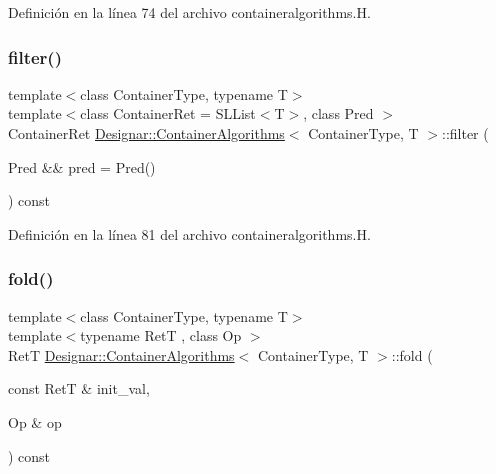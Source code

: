 Definición en la línea 74 del archivo containeralgorithms.\+H.

\mbox{\label{class_designar_1_1_container_algorithms_a9ee9df4da794711c3639a3c86d905443}} 
\subsubsection{\texorpdfstring{filter()}{filter()}\hspace{0.1cm}{\footnotesize\ttfamily [2/2]}}
{\footnotesize\ttfamily template$<$class Container\+Type, typename T$>$ \\
template$<$class Container\+Ret  = S\+L\+List$<$\+T$>$, class Pred $>$ \\
Container\+Ret \hyperlink{class_designar_1_1_container_algorithms}{Designar\+::\+Container\+Algorithms}$<$ Container\+Type, T $>$\+::filter (\begin{DoxyParamCaption}\item[{Pred \&\&}]{pred = {\ttfamily Pred()} }\end{DoxyParamCaption}) const\hspace{0.3cm}{\ttfamily [inline]}}



Definición en la línea 81 del archivo containeralgorithms.\+H.

\mbox{\label{class_designar_1_1_container_algorithms_a1b6d1cb2289bf894a2af994e9c6e1d03}} 
\subsubsection{\texorpdfstring{fold()}{fold()}\hspace{0.1cm}{\footnotesize\ttfamily [1/4]}}
{\footnotesize\ttfamily template$<$class Container\+Type, typename T$>$ \\
template$<$typename RetT , class Op $>$ \\
RetT \hyperlink{class_designar_1_1_container_algorithms}{Designar\+::\+Container\+Algorithms}$<$ Container\+Type, T $>$\+::fold (\begin{DoxyParamCaption}\item[{const RetT \&}]{init\+\_\+val,  }\item[{Op \&}]{op }\end{DoxyParamCaption}) const\hspace{0.3cm}{\ttfamily [inline]}}



